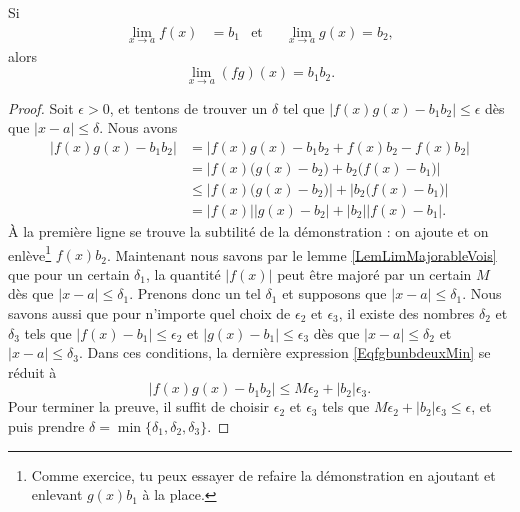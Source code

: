 \begin{theorem}     \label{Tholimfgabab}
    Si
    \begin{align}
        \lim_{x\to a}f(x)&=b_1&\text{et}&&\lim_{x\to a}g(x)=b_2,
    \end{align}
    alors
    \begin{equation}
        \lim_{x\to a}(fg)(x)=b_1b_2.
    \end{equation}
\end{theorem}

\begin{proof}
    Soit $\epsilon>0$, et tentons de trouver un $\delta$ tel que $| f(x)g(x)-b_1b_2 |\leq \epsilon$ dès que $| x-a |\leq \delta$. Nous avons 
    \begin{equation}    \label{EqfgbunbdeuxMin}
    \begin{split}
    | f(x)g(x)-b_1b_2 |&=|  f(x)g(x)-b_1b_2 +f(x)b_2-f(x)b_2 |\\
            &=\left|   f(x)\big( g(x)-b_2 \big)+b_2\big( f(x)-b_1 \big)    \right|\\
            &\leq \left|  f(x)\big( g(x)-b_2 \big)  \right|+\left|  b_2\big( f(x)-b_1 \big)    \right|\\
            &= | f(x) | | g(x)-b_2  |+| b_2 | |f(x)-b_1 |.  
    \end{split}
    \end{equation}
    À la première ligne se trouve la subtilité de la démonstration : on ajoute et on enlève\footnote{Comme exercice, tu peux essayer de refaire la démonstration en ajoutant et enlevant $g(x)b_1$ à la place.} $f(x)b_2$. Maintenant nous savons par le lemme \ref{LemLimMajorableVois} que pour un certain $\delta_1$, la quantité $| f(x) |$ peut être majoré par un certain $M$ dès que $| x-a |\leq \delta_1$. Prenons donc un tel $\delta_1$ et supposons que $| x-a |\leq \delta_1$. Nous savons aussi que pour n'importe quel choix de $\epsilon_2$ et $\epsilon_3$, il existe des nombres $\delta_2$ et $\delta_3$ tels que $| f(x)-b_1 |\leq \epsilon_2$ et $| g(x)-b_1 |\leq \epsilon_3$ dès que $| x-a |\leq\delta_2$ et $| x-a |\leq\delta_3$. Dans ces conditions, la dernière expression \eqref{EqfgbunbdeuxMin} se réduit à
    \begin{equation}
    | f(x)g(x)-b_1b_2 |\leq M\epsilon_2+| b_2 |\epsilon_3.
    \end{equation}
    Pour terminer la preuve, il suffit de choisir $\epsilon_2$ et $\epsilon_3$ tels que $M\epsilon_2+| b_2 |\epsilon_3\leq\epsilon$, et puis prendre $\delta=\min\{ \delta_1,\delta_2,\delta_3 \}$.



\end{proof}
